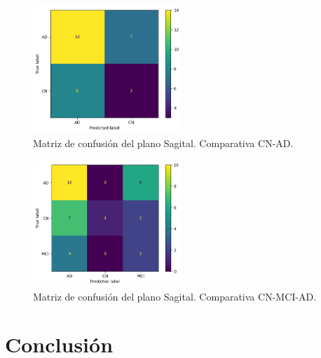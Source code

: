 \begin{figure}[H]
    \centering
    \includegraphics[width=0.5\textwidth]{./imgs/resultados/sagittal/CN_AD_cm_SAGITTAL}
    \caption{Matriz de confusión del plano Sagital. Comparativa CN-AD. }
    \label{fig:mc-sagital-cn-ad}
\end{figure}

\begin{figure}[H]
    \centering
    \includegraphics[width=0.5\textwidth]{./imgs/resultados/sagittal/CN_MCI_AD_cm_SAGITTAL}
    \caption{Matriz de confusión del plano Sagital. Comparativa CN-MCI-AD. }
    \label{fig:mc-sagital-cn-mci-ad}
\end{figure}


\section{Conclusión}
